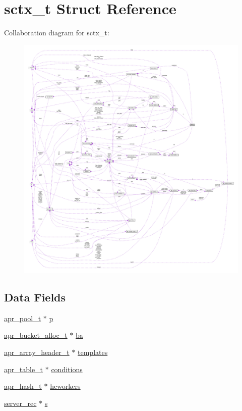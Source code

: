 \hypertarget{structsctx__t}{}\section{sctx\+\_\+t Struct Reference}
\label{structsctx__t}


Collaboration diagram for sctx\+\_\+t\+:
\nopagebreak
\begin{figure}[H]
\begin{center}
\leavevmode
\includegraphics[width=350pt]{structsctx__t__coll__graph}
\end{center}
\end{figure}
\subsection*{Data Fields}
\begin{DoxyCompactItemize}
\item 
\hyperlink{structapr__pool__t}{apr\+\_\+pool\+\_\+t} $\ast$ \hyperlink{structsctx__t_ae2ad192c1b486e54482af5f3ca4d23dc}{p}
\item 
\hyperlink{structapr__bucket__alloc__t}{apr\+\_\+bucket\+\_\+alloc\+\_\+t} $\ast$ \hyperlink{structsctx__t_ae4f66bdc364778aff90fd6e236ac59bb}{ba}
\item 
\hyperlink{structapr__array__header__t}{apr\+\_\+array\+\_\+header\+\_\+t} $\ast$ \hyperlink{structsctx__t_a89a8b9d8aa93bc9cc1fe1d79744ff107}{templates}
\item 
\hyperlink{structapr__table__t}{apr\+\_\+table\+\_\+t} $\ast$ \hyperlink{structsctx__t_a7a49fd5f4a0674a2182c397644e6e510}{conditions}
\item 
\hyperlink{structapr__hash__t}{apr\+\_\+hash\+\_\+t} $\ast$ \hyperlink{structsctx__t_a7a92dc7b70db47a0da4edcec0a3a8502}{hcworkers}
\item 
\hyperlink{structserver__rec}{server\+\_\+rec} $\ast$ \hyperlink{structsctx__t_a22b29e3e97ec1c1c3a3b881a80d245f2}{s}
\end{DoxyCompactItemize}


